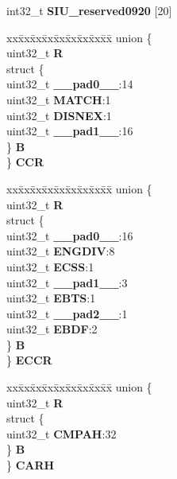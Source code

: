 \begin{DoxyCompactItemize}
\begin{tabbing}
\end{tabbing}\item 
\mbox{\label{structSIU__tag_a3aca8773ce35b2c848ed429850cd7137}} 
int32\+\_\+t {\bfseries S\+I\+U\+\_\+reserved0920} \mbox{[}20\mbox{]}
\item 
\mbox{\label{structSIU__tag_aa53767757f0389c423b3f4029d4e7d39}} 
\begin{tabbing}
xx\=xx\=xx\=xx\=xx\=xx\=xx\=xx\=xx\=\kill
union \{\\
\>uint32\_t {\bfseries R}\\
\>struct \{\\
\>\>uint32\_t {\bfseries \_\_pad0\_\_}:14\\
\>\>uint32\_t {\bfseries MATCH}:1\\
\>\>uint32\_t {\bfseries DISNEX}:1\\
\>\>uint32\_t {\bfseries \_\_pad1\_\_}:16\\
\>\} {\bfseries B}\\
\} {\bfseries CCR}\\

\end{tabbing}\item 
\mbox{\label{structSIU__tag_ada6957f68dd6c45bb44d8b08eb96f267}} 
\begin{tabbing}
xx\=xx\=xx\=xx\=xx\=xx\=xx\=xx\=xx\=\kill
union \{\\
\>uint32\_t {\bfseries R}\\
\>struct \{\\
\>\>uint32\_t {\bfseries \_\_pad0\_\_}:16\\
\>\>uint32\_t {\bfseries ENGDIV}:8\\
\>\>uint32\_t {\bfseries ECSS}:1\\
\>\>uint32\_t {\bfseries \_\_pad1\_\_}:3\\
\>\>uint32\_t {\bfseries EBTS}:1\\
\>\>uint32\_t {\bfseries \_\_pad2\_\_}:1\\
\>\>uint32\_t {\bfseries EBDF}:2\\
\>\} {\bfseries B}\\
\} {\bfseries ECCR}\\

\end{tabbing}\item 
\mbox{\label{structSIU__tag_a63620fbc1771748877a25f6d2742104e}} 
\begin{tabbing}
xx\=xx\=xx\=xx\=xx\=xx\=xx\=xx\=xx\=\kill
union \{\\
\>uint32\_t {\bfseries R}\\
\>struct \{\\
\>\>uint32\_t {\bfseries CMPAH}:32\\
\>\} {\bfseries B}\\
\} {\bfseries CARH}\\


\end{tabbing}
\end{DoxyCompactItemize}
